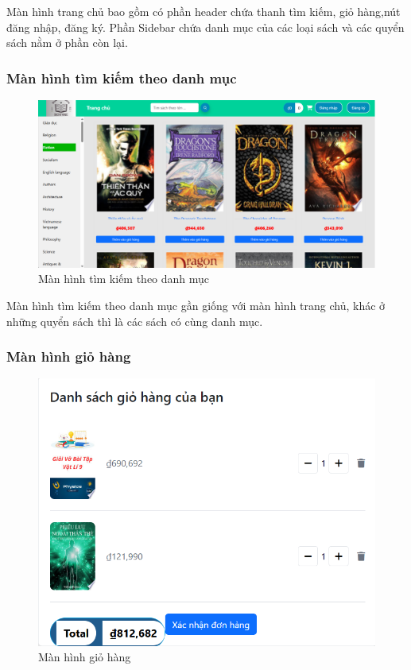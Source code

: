 \documentclass[../DoAn.tex]{subfiles}
\begin{document}
Màn hình trang chủ bao gồm có phần header chứa thanh tìm kiếm, giỏ hàng,nút đăng nhập, đăng ký. Phần Sidebar chứa danh mục của các loại sách và các quyển sách nằm ở phần còn lại.

\subsubsection{Màn hình tìm kiếm theo danh mục}
\begin{figure}[H]
    \centering
    \includegraphics[width=1\linewidth]{Hinhve/tìm kiếm theo danh mục.png}
    \caption{Màn hình tìm kiếm theo danh mục}
    \label{fig:visual category}
\end{figure}

Màn hình tìm kiếm theo danh mục gần giống với màn hình trang chủ, khác ở những quyển sách thì là các sách có cùng danh mục.

\subsubsection{Màn hình giỏ hàng}
\begin{figure}[H]
    \centering
    \includegraphics[width=1\linewidth]{Hinhve/giỏ hàng.png}
    \caption{Màn hình giỏ hàng}
    \label{fig:visual cart}
\end{figure}
\end{document}

